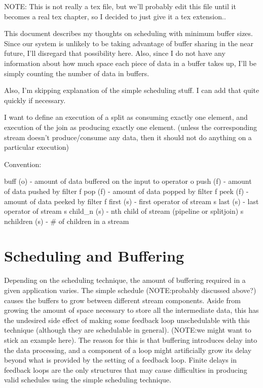 NOTE: This is not really a tex file, but we'll probably edit this file until 
it becomes a real tex chapter, so I decided to just give it a tex extension..

This document describes my thoughts on scheduling with minimum buffer sizes.
Since our system is unlikely to be taking advantage of buffer sharing in the 
near future, I'll disregard that possibility here.  Also, since I do not have 
any information about how much space each piece of data in a buffer takes up, 
I'll be simply counting the number of data in buffers.

Also, I'm skipping explanation of the simple scheduling stuff.  I can add that
quite quickly if necessary.

I want to define an execution of a split as consuming exactly one element, and
execution of the join as producing exactly one element. (unless the
corresponding stream doesn't produce/consume any data, then it should not
do anything on a particular execution)

Convention:

buff (o) - amount of data buffered on the input to operator o
push (f) - amount of data pushed by filter f
pop (f) - amount of data popped by filter f
peek (f) - amount of data peeked by filter f
first (s) - first operator of stream s
last (s) - last operator of stream s
child\_n (s) - nth child of stream (pipeline or splitjoin) s
nchildren (s) - # of children in a stream

\section{Scheduling and Buffering}

Depending on the scheduling technique, the amount of buffering required in a 
given application varies.  The simple schedule (NOTE:probably discussed above?) 
causes the buffers to grow between different stream components.  Aside from
growing the amount of space necessary to store all the intermediate data,
this has the undesired side effect of making some feedback loop unschedulable
with this technique (although they are schedulable in general).  (NOTE:we might
want to stick an example here).  The reason for this is that buffering
introduces delay into the data processing, and a component of a loop might
artificially grow its delay beyond what is provided by the \delay setting of 
a feedback loop.  Finite delays in feedback loops are the only structures
that may cause difficulties in producing valid schedules using the simple
scheduling technique.

